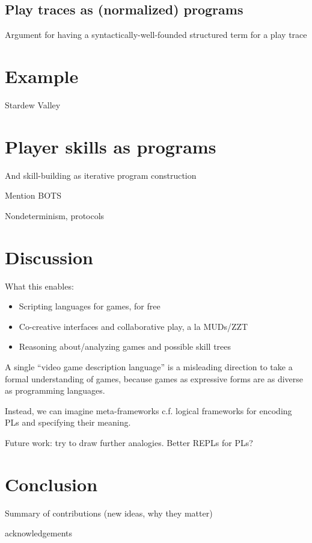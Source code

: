 \documentclass[sigconf]{acmart}
\begin{document}
  \subsection{Play traces as (normalized) programs}
  
  Argument for having a syntactically-well-founded structured term for a
  play trace
  
\section{Example}

Stardew Valley

\section{Player skills as programs}

And skill-building as iterative program construction

Mention BOTS

Nondeterminism, protocols

\section{Discussion}

  What this enables:
  \begin{itemize}
  \item Scripting languages for games, for free
  \item Co-creative interfaces and collaborative play, a la MUDs/ZZT
  \item Reasoning about/analyzing games and possible skill trees
  \end{itemize}

  A single ``video game description language'' is a misleading direction to
  take a formal understanding of games, because games as expressive forms
  are as diverse as programming languages.

  Instead, we can imagine meta-frameworks c.f. logical frameworks for
  encoding PLs and specifying their meaning.

  Future work: try to draw further analogies. Better REPLs for PLs? 

\section{Conclusion}

  Summary of contributions (new ideas, why they matter)

\begin{acks}
  acknowledgements
\end{acks}

% 
%  
\end{document}
